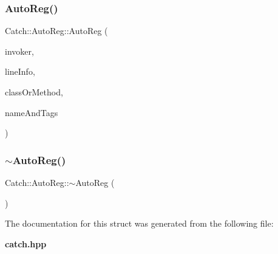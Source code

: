 \subsubsection{AutoReg()}
{\footnotesize\ttfamily Catch\+::\+Auto\+Reg\+::\+Auto\+Reg (\begin{DoxyParamCaption}\item[{\textbf{ I\+Test\+Invoker} $\ast$}]{invoker,  }\item[{\textbf{ Source\+Line\+Info} const \&}]{line\+Info,  }\item[{\textbf{ String\+Ref} const \&}]{class\+Or\+Method,  }\item[{\textbf{ Name\+And\+Tags} const \&}]{name\+And\+Tags }\end{DoxyParamCaption})\hspace{0.3cm}{\ttfamily [noexcept]}}

\mbox{\label{struct_catch_1_1_auto_reg_a3cdb53f1e5ff115310f3372bebe198f1}} 
\subsubsection{$\sim$AutoReg()}
{\footnotesize\ttfamily Catch\+::\+Auto\+Reg\+::$\sim$\+Auto\+Reg (\begin{DoxyParamCaption}{ }\end{DoxyParamCaption})}



The documentation for this struct was generated from the following file\+:\begin{DoxyCompactItemize}
\item 
\textbf{ catch.\+hpp}\end{DoxyCompactItemize}
